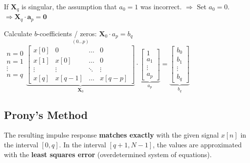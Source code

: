 \begin{aufzaehlung}
		\vspace{-0.5cm}
		If \(\bm X_q\) is singular, the assumption that $a_0 = 1$ was incorrect. $\Longrightarrow$ Set $a_0=0$.
		$ \Longrightarrow \bm X_q \cdot \bm a_p = \bm 0$

  		\item Calculate $b$-coefficients / zeros: $\bm X_0 \cdot a_p = b_q$ \small \hspace{0.5cm}
		$ \begin{matrix} n=0\\ n=1\\ \vdots\\ n=q \end{matrix} \overset{(0 \hdots p)}{\underbrace{\begin{bmatrix}
    		x[0] & 0 & \hdots & 0 \\
    		x[1] & x[0] & \hdots & 0 \\
    		\vdots & \vdots & \ddots & \vdots \\
    		x[q] & x[q-1] & \hdots & x[q-p]
		\end{bmatrix}  }_{\bm X_0}}\cdot \underbrace{\begin{bmatrix}
    		1 \\
    		a_1 \\
    		\vdots \\
    		a_p
		\end{bmatrix}  }_{a_p}= 	\underbrace{\begin{bmatrix}
	    		b_0 \\
	    		b_1 \\
	    		\vdots \\
	    		b_q
			\end{bmatrix}}_{b_q}$ \normalsize

	\end{aufzaehlung}

\vspace{-1.0cm}


\subsection{Prony's Method }
The resulting impulse response \textbf{matches exactly} with the given signal $x[n]$ in the interval $[0, q]$.
In the interval $[q + 1, N-1]$, the values are approximated with the
\textbf{least squares error} (overdetermined system of equations).


\renewcommand{\arraystretch}{1.0}

